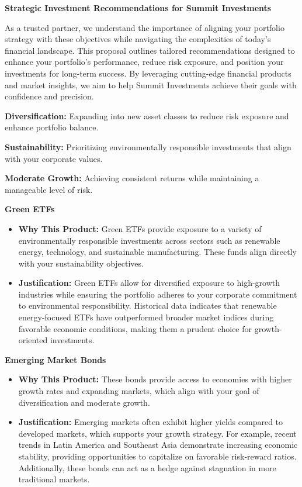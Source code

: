 \documentclass[11pt]{article}
\begin{document}
\begin{tcolorbox}[enhanced, colback=boxgray, frame hidden, arc=2mm,
    left=5mm, right=5mm, top=4mm, bottom=4mm, breakable]
{\large\bfseries Strategic Investment Recommendations for Summit Investments}
\par\medskip
As a trusted partner, we understand the importance of aligning your portfolio
strategy with these objectives while navigating the complexities of today's
financial landscape. This proposal outlines tailored recommendations designed
to enhance your portfolio's performance, reduce risk exposure, and position
your investments for long-term success. By leveraging cutting-edge financial
products and market insights, we aim to help Summit Investments achieve their
goals with confidence and precision.

\textbf{Diversification:} Expanding into new asset classes to reduce risk
exposure and enhance portfolio balance.\par\smallskip
\textbf{Sustainability:} Prioritizing environmentally responsible investments
that align with your corporate values.\par\smallskip
\textbf{Moderate Growth:} Achieving consistent returns while maintaining a
manageable level of risk.

\textbf{Green ETFs}
\begin{itemize}[leftmargin=1.5em, itemsep=2pt]
  \item \textbf{Why This Product:} Green ETFs provide exposure to a variety of
  environmentally responsible investments across sectors such as renewable
  energy, technology, and sustainable manufacturing. These funds align
  directly with your sustainability objectives.
  \item \textbf{Justification:} Green ETFs allow for diversified exposure to
  high-growth industries while ensuring the portfolio adheres to your
  corporate commitment to environmental responsibility. Historical data
  indicates that renewable energy-focused ETFs have outperformed broader
  market indices during favorable economic conditions, making them a prudent
  choice for growth-oriented investments.
\end{itemize}
\textbf{Emerging Market Bonds}
\begin{itemize}[leftmargin=1.5em, itemsep=2pt]
  \item \textbf{Why This Product:} These bonds provide access to economies with
  higher growth rates and expanding markets, which align with your goal of
  diversification and moderate growth.
  \item \textbf{Justification:} Emerging markets often exhibit higher yields
  compared to developed markets, which supports your growth strategy. For
  example, recent trends in Latin America and Southeast Asia demonstrate
  increasing economic stability, providing opportunities to capitalize on
  favorable risk-reward ratios. Additionally, these bonds can act as a hedge
  against stagnation in more traditional markets.
\end{itemize}


\end{tcolorbox}
\end{document}

